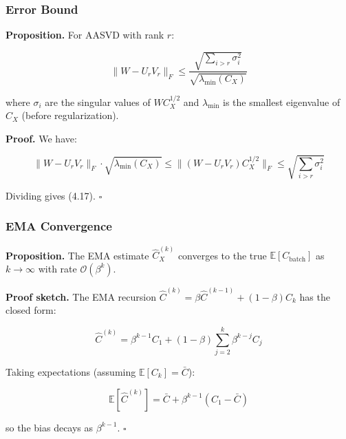 \subsubsection{Error Bound}

\textbf{Proposition.} For AASVD with rank $r$:

\[
\|W - U_r V_r\|_F \leq \frac{\sqrt{\sum_{i > r} \sigma_i^2}}{\sqrt{\lambda_\text{min}(C_X)}}
\tag{4.17}
\]

where $\sigma_i$ are the singular values of $W C_X^{1/2}$ and $\lambda_\text{min}$ 
is the smallest eigenvalue of $C_X$ (before regularization).

\textbf{Proof.} We have:

\[
\|W - U_r V_r\|_F \cdot \sqrt{\lambda_\text{min}(C_X)}
\leq \|(W - U_r V_r) C_X^{1/2}\|_F
\leq \sqrt{\sum_{i > r} \sigma_i^2}
\tag{4.18}
\]

Dividing gives (4.17). $\square$

\subsubsection{EMA Convergence}

\textbf{Proposition.} The EMA estimate $\hat{C}_X^{(k)}$ converges to the true 
$\mathbb{E}[C_\text{batch}]$ as $k \to \infty$ with rate $\mathcal{O}(\beta^k)$.

\textbf{Proof sketch.} The EMA recursion $\hat{C}^{(k)} = \beta \hat{C}^{(k-1)} + (1-\beta) C_k$ 
has the closed form:

\[
\hat{C}^{(k)} = \beta^{k-1} C_1 + (1 - \beta) \sum_{j=2}^{k} \beta^{k-j} C_j
\tag{4.19}
\]

Taking expectations (assuming $\mathbb{E}[C_k] = \bar{C}$):

\[
\mathbb{E}[\hat{C}^{(k)}] = \bar{C} + \beta^{k-1} (C_1 - \bar{C})
\tag{4.20}
\]

so the bias decays as $\beta^{k-1}$. $\square$